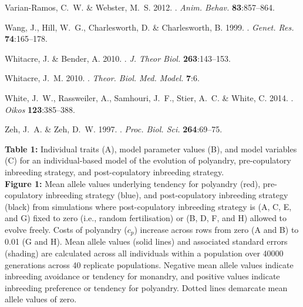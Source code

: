 \documentclass[12pt]{article}
\begin{document}
\begin{thebibliography}{73}
Varian-Ramos, C.~W. \& Webster, M.~S. 2012.
.
\newblock \textit{Anim. Behav.} \textbf{83}:857--864.

Wang, J., Hill, W.~G., Charlesworth, D. \& Charlesworth, B. 1999.
.
\newblock \textit{Genet. Res.} \textbf{74}:165--178.

Whitacre, J. \& Bender, A. 2010.
.
\newblock \textit{J. Theor Biol.} \textbf{263}:143--153.

Whitacre, J.~M. 2010.
.
\newblock \textit{Theor. Biol. Med. Model.} \textbf{7}:6.

White, J.~W., Rassweiler, A., Samhouri, J.~F., Stier, A.~C. \& White, C. 2014.
.
\newblock \textit{Oikos} \textbf{123}:385--388.

Zeh, J.~A. \& Zeh, D.~W. 1997.
.
\newblock \textit{Proc. Biol. Sci.} \textbf{264}:69--75.

\end{thebibliography}

\clearpage

\noindent \textbf{Table 1:} Individual traits (A), model parameter values (B), and model variables (C) for an individual-based model of the evolution of polyandry, pre-copulatory inbreeding strategy, and post-copulatory inbreeding strategy. \\

\noindent \textbf{Figure 1:} Mean allele values underlying tendency for polyandry (red), pre-copulatory inbreeding strategy (blue), and post-copulatory inbreeding strategy (black) from simulations where post-copulatory inbreeding strategy is (A, C, E, and G) fixed to zero (i.e., random fertilisation) or (B, D, F, and H) allowed to evolve freely. Costs of polyandry ($c_p$) increase across rows from zero (A and B) to 0.01 (G and H). Mean allele values (solid lines) and associated standard errors (shading) are calculated across all individuals within a population over 40000 generations across 40 replicate populations. Negative mean allele values indicate inbreeding avoidance or tendency for monandry, and positive values indicate inbreeding preference or tendency for polyandry. Dotted lines demarcate mean allele values of zero.  \\
\end{document}
